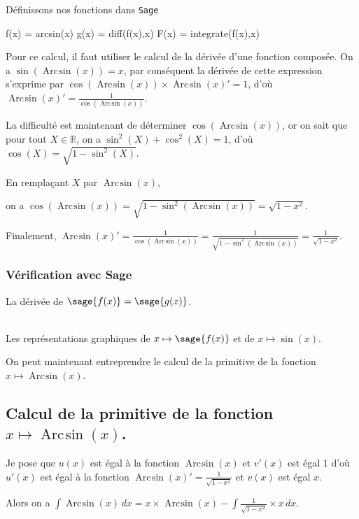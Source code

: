 \documentclass[a4paper,landscape,17pt]{extreport} %
\def\eclaire{\mathbb}
\def\R{\ensuremath{\eclaire R}}
\renewcommand{\arcsin}{\mathop{\mathrm{Arc\mspace{2mu}sin}}}
\begin{document}
Définissons nos fonctions dans {\texttt{Sage}}
\begin{sageblock}
    f(x) = arcsin(x)
    g(x) = diff(f(x),x)
    F(x) = integrate(f(x),x)
\end{sageblock}


Pour ce calcul, il faut utiliser le calcul de la dérivée d'une fonction composée. On a $\sin(\arcsin(x))=x$, par conséquent la dérivée de cette expression s'exprime par $ \cos(\arcsin(x)) \times \arcsin(x) ' = 1$, d'où $\arcsin(x) ' = \frac{1}{\cos(\arcsin(x))} $.

La difficulté est maintenant de déterminer $\cos(\arcsin(x))$, or on sait que pour tout $X \in \R$, on a $\sin^2(X) + \cos^2(X) = 1$, d'où $\cos(X) = \sqrt{1-\sin^2(X)}$.

En remplaçant $X$ par $\arcsin(x)$, 

on a $\cos(\arcsin(x)) = \sqrt{1-\sin^2(\arcsin(x))} = \sqrt{1- x^2}$.

Finalement, $\arcsin(x) ' = \frac{1}{\cos(\arcsin(x))}  = \frac{1}{\sqrt{1-\sin^2(\arcsin(x))}} =  \frac{1}{\sqrt{1- x^2}} $.

\subsubsection{Vérification avec Sage}

La dérivée de $\sage{f(x)} = \sage{g(x)} $.


\begin{center}
\\
Les représentations graphiques de $x \mapsto \sage{f(x)} $ et de $x\mapsto \sin(x)$.
\end{center}


On peut maintenant entreprendre le calcul de la primitive de la  fonction  $x \mapsto \arcsin(x) $.

\subsection{Calcul de la primitive de la fonction  $x \mapsto \arcsin(x) $.}


Je pose que $u(x)$  est égal à la fonction $\arcsin(x)$ et $v'(x)$ est égal $1$  d'où $u'(x)$  est égal à la fonction $\arcsin(x) ' = \frac{1}{\sqrt{1- x^2}} $ et $v(x)$ est égal $x$.

Alors on a $\int \arcsin(x) \, dx = x \times \arcsin(x) -\int \frac{1}{\sqrt{1- x^2}} \times x \, dx $.
\end{document}
